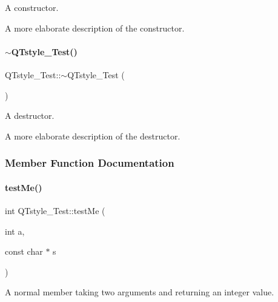A constructor. 

A more elaborate description of the constructor. \mbox{\label{class_q_tstyle___test_a7e82397d534d9a867f0857da01a46e9e}} 
\paragraph{\texorpdfstring{$\sim$QTstyle\_Test()}{~QTstyle\_Test()}}
{\footnotesize\ttfamily Q\+Tstyle\+\_\+\+Test\+::$\sim$\+Q\+Tstyle\+\_\+\+Test (\begin{DoxyParamCaption}{ }\end{DoxyParamCaption})}



A destructor. 

A more elaborate description of the destructor. 

\subsubsection{Member Function Documentation}
\mbox{\label{class_q_tstyle___test_a8840748753118dd468e8368a28e49c62}} 
\paragraph{\texorpdfstring{testMe()}{testMe()}}
{\footnotesize\ttfamily int Q\+Tstyle\+\_\+\+Test\+::test\+Me (\begin{DoxyParamCaption}\item[{int}]{a,  }\item[{const char $\ast$}]{s }\end{DoxyParamCaption})}



A normal member taking two arguments and returning an integer value. 


